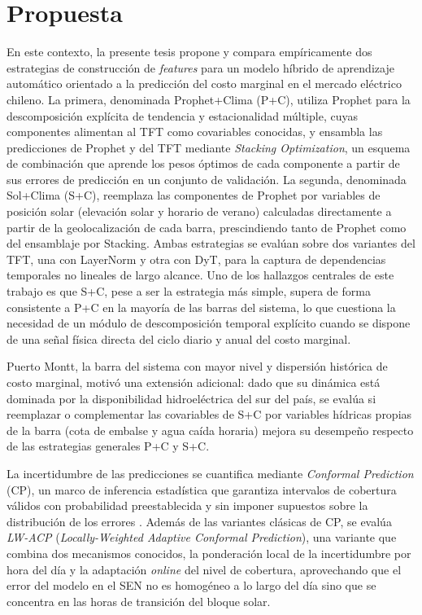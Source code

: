 \section{Propuesta}

En este contexto, la presente tesis propone y compara empíricamente dos estrategias de construcción de \textit{features} para un modelo híbrido de aprendizaje automático orientado a la predicción del costo marginal en el mercado eléctrico chileno. La primera, denominada Prophet+Clima (P+C), utiliza Prophet para la descomposición explícita de tendencia y estacionalidad múltiple, cuyas componentes alimentan al TFT como covariables conocidas, y ensambla las predicciones de Prophet y del TFT mediante \textit{Stacking Optimization}, un esquema de combinación que aprende los pesos óptimos de cada componente a partir de sus errores de predicción en un conjunto de validación. La segunda, denominada Sol+Clima (S+C), reemplaza las componentes de Prophet por variables de posición solar (elevación solar y horario de verano) calculadas directamente a partir de la geolocalización de cada barra, prescindiendo tanto de Prophet como del ensamblaje por Stacking. Ambas estrategias se evalúan sobre dos variantes del TFT, una con LayerNorm y otra con DyT, para la captura de dependencias temporales no lineales de largo alcance. Uno de los hallazgos centrales de este trabajo es que S+C, pese a ser la estrategia más simple, supera de forma consistente a P+C en la mayoría de las barras del sistema, lo que cuestiona la necesidad de un módulo de descomposición temporal explícito cuando se dispone de una señal física directa del ciclo diario y anual del costo marginal.

Puerto Montt, la barra del sistema con mayor nivel y dispersión histórica de costo marginal, motivó una extensión adicional: dado que su dinámica está dominada por la disponibilidad hidroeléctrica del sur del país, se evalúa si reemplazar o complementar las covariables de S+C por variables hídricas propias de la barra (cota de embalse y agua caída horaria) mejora su desempeño respecto de las estrategias generales P+C y S+C.

La incertidumbre de las predicciones se cuantifica mediante \textit{Conformal Prediction} (CP), un marco de inferencia estadística que garantiza intervalos de cobertura válidos con probabilidad preestablecida y sin imponer supuestos sobre la distribución de los errores \cite{ConformalPrediction}. Además de las variantes clásicas de CP, se evalúa \textit{LW-ACP} (\textit{Locally-Weighted Adaptive Conformal Prediction}), una variante que combina dos mecanismos conocidos, la ponderación local de la incertidumbre por hora del día y la adaptación \textit{online} del nivel de cobertura, aprovechando que el error del modelo en el SEN no es homogéneo a lo largo del día sino que se concentra en las horas de transición del bloque solar.

